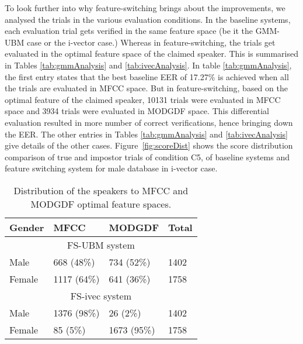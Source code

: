 \documentclass{article}
\begin{document}
To look further into why feature-switching brings about the improvements, we
analysed the trials in the various evaluation conditions. In the baseline
systems, each evaluation trial gets verified in the same feature space (be it
the GMM-UBM case or the i-vector case.) Whereas in feature-switching, the trials
get evaluated in the optimal feature space of the claimed speaker. This is
summarised in Tables \ref{tab:gmmAnalysis} and \ref{tab:ivecAnalysis}.  In table
\ref{tab:gmmAnalysis}, the first entry states that the best baseline EER of
17.27\% is achieved when all the trials are evaluated in MFCC space. But in
feature-switching, based on the optimal feature of the claimed speaker, 10131
trials were evaluated in MFCC space and 3934 trials were evaluated in MODGDF
space. This differential evaluation resulted in more number of correct
verifications, hence bringing down the EER. The other entries in Tables
\ref{tab:gmmAnalysis} and \ref{tab:ivecAnalysis} give details of the other
cases. Figure~\ref{fig:scoreDist} shows the score distribution comparison of true and impostor trials of condition C5, of baseline systems and feature switching system for male database in i-vector case.

\begin{table}[h]
\centering
\caption{Distribution of the speakers to MFCC and MODGDF optimal feature spaces.}
\begin{tabular}{|l|l|l|l|}
\hline
Gender & MFCC & MODGDF & Total \\
\hline
\multicolumn{4}{|c|}{FS-UBM system}\\
\hline
Male & 668 (48\%) & 734 (52\%) & 1402 \\
Female & 1117 (64\%) & 641 (36\%) & 1758 \\
\hline
\multicolumn{4}{|c|}{FS-ivec system}\\
\hline
Male & 1376 (98\%)& 26 (2\%)& 1402 \\
Female & 85 (5\%) & 1673 (95\%) & 1758 \\
\hline
\end{tabular}
\label{tab:optFeat}
\end{table}

\end{document}
